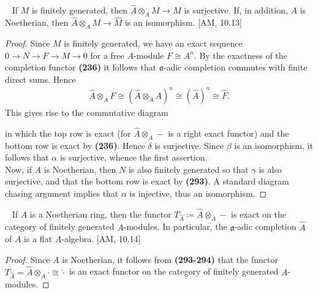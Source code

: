 \documentclass[12pt,a4paper,footinclude=true,headinclude=true]{scrbook} %
\newenvironment{proposition}[2][]
{\renewcommand\theinnercustomprop{#2}\innercustomprop[#1] 
\begin{mdframed}[backgroundcolor=gray!20]\ }
{\end{mdframed}\endinnercustomprop}
\begin{document}
\begin{proposition}{294}
    If $M$ is finitely generated, then $\widehat{A}\otimes_AM\to\widehat{M}$ is surjective. If, in addition, $A$ is Noetherian, then $\widehat{A}\otimes_AM\to\widehat{M}$ is an isomorphism. [AM, 10.13]
\end{proposition}
\begin{proof}
    Since $M$ is finitely generated, we have an exact sequence $0\to N\to F\to M\to0$ for a free $A$-module $F\cong A^n$. By the exactness of the completion functor \textbf{(236)} it follows that $\mathfrak{a}$-adic completion commutes with finite direct sums. Hence 
    \begin{align*}
        \widehat{A}\otimes_AF\cong(\widehat{A}\otimes_AA)^n\cong(\widehat{A})^n\cong\widehat{F}.
    \end{align*}
    \newpage This gives rise to the commutative diagram
    \begin{center}
    \end{center}
    in which the top row is exact (for $\widehat{A}\otimes_A-$ is a right exact functor) and the bottom row is exact by \textbf{(236)}. Hence $\delta$ is surjective. Since $\beta$ is an isomorphism, it follows that $\alpha$ is surjective, whence the first assertion.\\
    Now, if $A$ is Noetherian, then $N$ is also finitely generated so that $\gamma$ is also surjective, and that the bottom row is exact by \textbf{(293)}. A standard diagram chasing argument implies that $\alpha$ is injective, thus an isomorphism.
\end{proof}

\begin{proposition}{295}
    If $A$ is a Noetherian ring, then the functor $T_{\widehat{A}}\coloneqq\widehat{A}\otimes_A-$ is exact on the category of finitely generated $A$-modules. In particular, the $\mathfrak{a}$-adic completion $\widehat{A}$ of $A$ is a flat $A$-algebra. [AM, 10.14]
\end{proposition}
\begin{proof}
    Since $A$ is Noetherian, it follows from \textbf{(293-294)} that the functor $T_{\widehat{A}}=\widehat{A}\otimes_A\cdot\cong\widehat{\cdot}$ is an exact functor on the category of finitely generated $A$-modules.
\end{proof}
\end{document}
